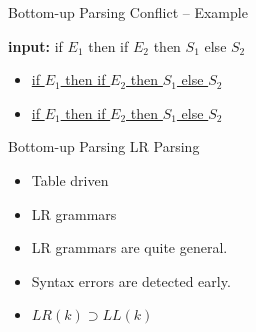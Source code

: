 \documentclass{beamer}
\begin{document}
\begin{frame}{Bottom-up Parsing}
{Conflict -- Example}

\textbf{input:} if $E_1$ then if $E_2$ then $S_1$ else $S_2$

\pause
\begin{center}

\pause
\begin{itemize}
	\item \underline{if $E_1$ then \underline{if $E_2$ then $S_1$} else $S_2$}
	\item \underline{if $E_1$ then \underline{if $E_2$ then $S_1$ else $S_2$}}
\end{itemize}
\end{center}

\end{frame}

\begin{frame}{Bottom-up Parsing}
{LR Parsing}


\begin{itemize}
	\item Table driven
	\item LR grammars
\end{itemize}

\pause
{}
\begin{itemize}
	\item LR grammars are quite general.
	\item Syntax errors are detected early.
	\item $LR(k) \supset LL(k)$
\end{itemize}

\end{frame}
\end{document}
